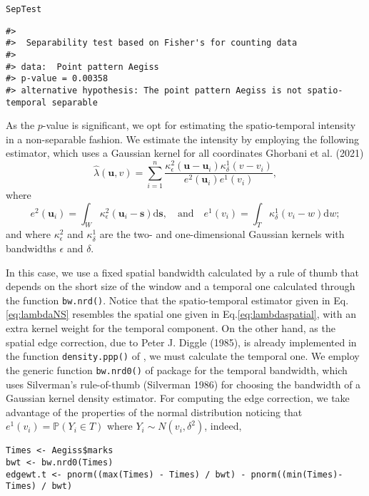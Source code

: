 \begin{verbatim}
SepTest
\end{verbatim}

\begin{verbatim}
#> 
#>  Separability test based on Fisher's for counting data
#> 
#> data:  Point pattern Aegiss
#> p-value = 0.00358
#> alternative hypothesis: The point pattern Aegiss is not spatio-temporal separable
\end{verbatim}

As the \(p\)-value is significant, we opt for estimating the spatio-temporal intensity in a non-separable fashion. We estimate the intensity by employing the following estimator, which uses a Gaussian kernel for all coordinates Ghorbani et al. (2021)
\begin{equation}
    \hat{\lambda}(\mathbf{u},v)=\sum_{i=1}^{n}\frac{\kappa_{\epsilon}^{2}(\mathbf{u}-\mathbf{u}_i)\kappa_{\delta}^{1}(v-v_i)}{e^2(\mathbf{u}_i)e^1(v_i)},
    \label{eq:lambdaNS}
\end{equation}
where
\[
e^2(\mathbf{u}_i)=\int_{W} \kappa_{\epsilon}^{2}(\mathbf{u}_i-\mathbf{s})\text{d} \mathbf{s}, \quad \text{and}\quad e^1(v_i)=\int_{T} \kappa_{\delta}^{1}(v_i-w)\text{d} w;
\]
and where \(\kappa_{\epsilon}^{2}\) and \(\kappa_{\delta}^{1}\) are the two- and one-dimensional Gaussian kernels with bandwidths \(\epsilon\) and \(\delta\).

In this case, we use a fixed spatial bandwidth calculated by a rule of thumb that depends on the short size of the window and a temporal one calculated through the function \texttt{bw.nrd()}. Notice that the spatio-temporal estimator given in Eq.\eqref{eq:lambdaNS} resembles the spatial one given in Eq.\eqref{eq:lambdaspatial}, with an extra kernel weight for the temporal component. On the other hand, as the spatial edge correction, due to Peter J. Diggle (1985), is already implemented in the function \texttt{density.ppp()} of , we must calculate the temporal one. We employ the generic function \texttt{bw.nrd0()} of package  for the temporal bandwidth, which uses Silverman's rule-of-thumb (Silverman 1986) for choosing the bandwidth of a Gaussian kernel density estimator. For computing the edge correction, we take advantage of the properties of the normal distribution noticing that \(e^1(v_i)=\mathbb{P}(Y_i \in T)\) where \(Y_i \sim N(v_i, \delta^2)\), indeed,

\begin{verbatim}
Times <- Aegiss$marks
bwt <- bw.nrd0(Times)
edgewt.t <- pnorm((max(Times) - Times) / bwt) - pnorm((min(Times)- Times) / bwt) 
\end{verbatim}

